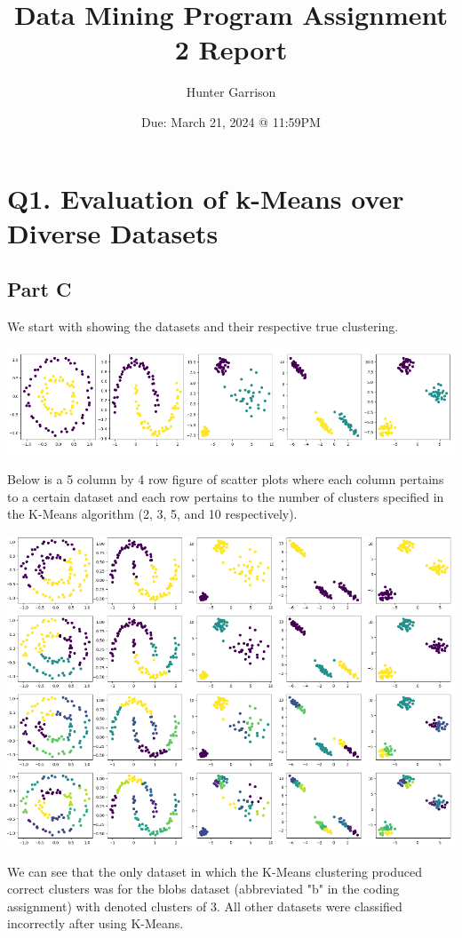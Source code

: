 \documentclass{article}
\title{Data Mining Program Assignment 2 Report}
\author{Hunter Garrison}
\date{Due: March 21, 2024 @ 11:59PM}
\begin{document}
\maketitle  %

\section*{Q1. Evaluation of k-Means over Diverse Datasets}

\subsection*{Part C}
We start with showing the datasets and their respective true clustering.

\includegraphics[width=\linewidth]{Images/Screenshot 2024-03-04 174741.png}

Below is a 5 column by 4 row figure of scatter plots where each column pertains to a certain dataset and 
each row pertains to the number of clusters specified in the K-Means algorithm (2, 3, 5, and 10 
respectively).

\includegraphics[width=\linewidth]{Images/Screenshot 2024-03-04 175109.png}

We can see that the only dataset in which the K-Means clustering produced correct clusters was for the 
blobs dataset (abbreviated "b" in the coding assignment) with denoted clusters of 3. All other datasets were 
classified incorrectly after using K-Means.
\end{document}
